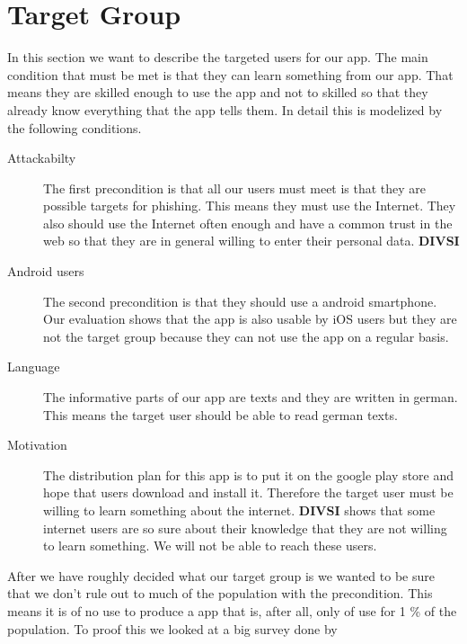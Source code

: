 \section{Target Group}
\label{s:target_group}
In this section we want to describe the targeted users for our app.
The main condition that must be met is that they can learn something from our app.
That means they are skilled enough to use the app and not to skilled so that they already know everything that the app tells them.
In detail this is modelized by the following conditions.
\begin{description}
\item[Attackabilty] The first precondition is that all our users must meet is that they are possible targets for phishing.
This means they must use the Internet.
They also should use the Internet often enough and have a common trust in the web so that they are in general willing to enter their personal data.
\textbf{DIVSI}
\item[Android users] The second precondition is that they should use a android smartphone.
Our evaluation shows that the app is also usable by iOS users but they are not the target group because they can not use the app on a regular basis.
\item[Language] The informative parts of our app are texts and they are written in german.
This means the target user should be able to read german texts.
\item[Motivation] The distribution plan for this app is to put it on the google play store and hope that users download and install it.
Therefore the target user must be willing to learn something about the internet.
\textbf{DIVSI} shows that some internet users are so sure about their knowledge that they are not willing to learn something.
We will not be able to reach these users.
\end{description}

After we have roughly decided what our target group is we wanted to be sure that we don't rule out to much of the population with the precondition.
This means it is of no use to produce a app that is, after all, only of use for 1 \% of the population.
To proof this we looked at a big survey done by 
